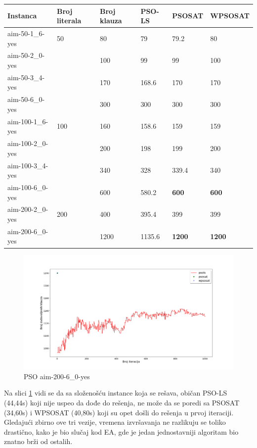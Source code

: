 \documentclass[a4paper]{article}
\begin{document}
\begin{table}[h!]
\centering
{}\label{tab:SAT} 
\begin{tabular}{ |p{2.5cm}|p{1.4cm}|p{1.4cm}||p{1.6cm}|p{1.6cm}|p{1.6cm}|}
\hline
 Instanca & Broj \break literala & Broj \break klauza & PSO-LS & PSOSAT & WPSOSAT \\
 \hline
 aim-50-1\_6-yes & 50 & 80 & 79 & 79.2 & 80 \\
 aim-50-2\_0-yes &  & 100 & 99 & 99 & 100 \\
 aim-50-3\_4-yes &  & 170 & 168.6 & 170 & 170 \\
 aim-50-6\_0-yes &  & 300 & 300 & 300 & 300 \\
 \hline
 aim-100-1\_6-yes & 100 & 160 & 158.6 & 159 & 159 \\
 aim-100-2\_0-yes &  & 200 & 198 & 199 & 200 \\
 aim-100-3\_4-yes &  & 340 & 328 & 339.4 & 340 \\ 
 aim-100-6\_0-yes &  & 600 & 580.2 & \textbf{600} & \textbf{600} \\
 \hline
 aim-200-2\_0-yes & 200 & 400 & 395.4 & 399 & 399 \\
 aim-200-6\_0-yes &  & 1200 & 1135.6 & \textbf{1200} & \textbf{1200} \\ 
 \hline
\end{tabular}
\end{table}

\begin{figure}[h!]
\centering
\includegraphics[width=\textwidth]{pso-aim-200-6_0-yes.png}
\caption{PSO aim-200-6\_0-yes}\label{img:pso-200-6-0-yes}
\end{figure}

Na slici \ref{img:pso-200-6-0-yes} vidi se da sa složenošću instance koja se rešava,
običan PSO-LS (44,44s) koji nije uspeo da dođe do rešenja,
ne može da se poredi sa PSOSAT (34,60s) i WPSOSAT (40,80s) koji su 
opet došli do rešenja u prvoj iteraciji. Gledajući zbirno ove tri vezije, 
vremena izvršavanja ne razlikuju se toliko drastično, kako je bio slučaj kod EA, 
gde je jedan jednostavniji algoritam bio znatno brži od ostalih. \\
\end{document}

